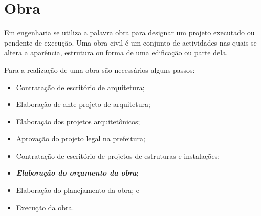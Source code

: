 \chapter{Obra}
Em engenharia se utiliza a palavra obra para designar um projeto executado ou pendente de execução. Uma obra civil é um conjunto de actividades nas quais se altera a aparência, estrutura ou forma de uma edificação ou parte dela. \cite{WIKIO}

Para a realização de uma obra são necessários alguns passos:


\begin{itemize}
	\item Contratação de escritório de arquitetura;
	\item Elaboração de ante-projeto de arquitetura;
	\item Elaboração dos projetos arquitetônicos;
	\item Aprovação do projeto legal na prefeitura;
	\item Contratação de escritório de projetos de estruturas e instalações;
	\item \emph{\textbf{Elaboração do orçamento da obra}};
	\item Elaboração do planejamento da obra; e
	\item Execução da obra.
\end{itemize}